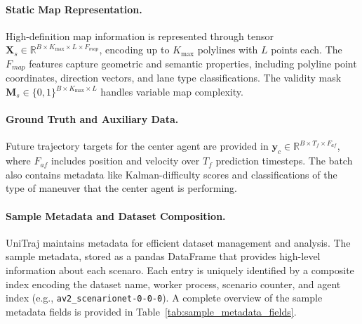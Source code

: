 \paragraph{Static Map Representation.}
High-definition map information is represented through tensor \(\boldsymbol{X}_s \in \mathbb{R}^{B \times K_{\max} \times L \times F_{map}}\), encoding up to \(K_{\max}\) polylines with \(L\) points each. The \(F_{map}\) features capture geometric and semantic properties, including polyline point coordinates, direction vectors, and lane type classifications. The validity mask \(\boldsymbol{M}_s \in \{0,1\}^{B \times K_{\max} \times L}\) handles variable map complexity.

\paragraph{Ground Truth and Auxiliary Data.}
Future trajectory targets for the center agent are provided in \(\boldsymbol{y}_c \in \mathbb{R}^{B \times T_f \times F_{af}}\), where \(F_{af}\) includes position and velocity over \(T_f\) prediction timesteps. The batch also contains metadata like Kalman-difficulty scores and classifications of the type of maneuver that the center agent is performing.

\paragraph{Sample Metadata and Dataset Composition.}
UniTraj maintains metadata for efficient dataset management and analysis. The sample metadata, stored as a pandas DataFrame that provides high-level information about each scenaro. Each entry is uniquely identified by a composite index encoding the dataset name, worker process, scenario counter, and agent index (e.g., \texttt{av2\_scenarionet{-}0{-}0{-}0}). A complete overview of the sample metadata fields is provided in Table~\ref{tab:sample_metadata_fields}.

\newpage
